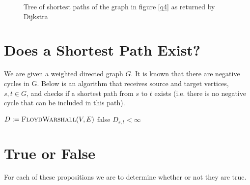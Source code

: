 \documentclass{article}
\begin{document}
\begin{figure}[htbp]
	\centering
	\caption{Tree of shortest paths of the graph in figure \ref{q4} as returned by Dijkstra}
	\label{q4-tree}
\end{figure}

\section{Does a Shortest Path Exist?}

We are given a weighted directed graph \(G\). It is known that there are negative cycles in G. Below is an algorithm that receives source and target vertices, \(s, t \in G\), and checks if a shortest path from \(s\) to \(t\) exists (i.e. there is no negative cycle that can be included in this path).

\begin{algorithm}
	\begin{algorithmic}
		\State \(D := \Call{FloydWarshall}{V, E}\)
		 
		 
		\State \Return false
		\EndIf
		\EndIf
		\EndFor
		\State \Return \(D_{s,t} < \infty\) 
		\EndFunction
	\end{algorithmic}
\end{algorithm}

\section{True or False}

For each of these propositions we are to determine whether or not they are true.
\end{document}
